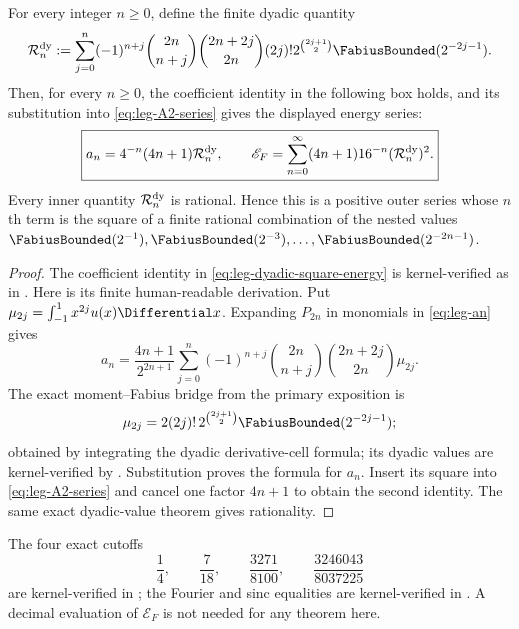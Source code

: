 \begin{corollary}
\label{cor:leg-dyadic-square-energy}
For every integer $n\ge0$, define the finite dyadic quantity
\begin{equation}
 \mathcal R_n^{\rm dy}:=
 \sum_{j=0}^{n}(-1)^{n+j}
 \binom{2n}{n+j}\binom{2n+2j}{2n}(2j)!
 2^{\binom{2j+1}{2}}\FabiusBounded(2^{-2j-1}).
 \label{eq:leg-dyadic-R}
\end{equation}
Then, for every $n\ge0$, the coefficient identity in the following box
holds, and its substitution into \eqref{eq:leg-A2-series} gives the displayed
energy series:
\begin{equation}
 \boxed{a_n=4^{-n}(4n+1)\mathcal R_n^{\rm dy},
 \qquad
 \mathscr E_F=\sum_{n=0}^{\infty}
 (4n+1)16^{-n}(\mathcal R_n^{\rm dy})^2.}
 \label{eq:leg-dyadic-square-energy}
\end{equation}
Every inner quantity $\mathcal R_n^{\rm dy}$ is rational.  Hence this is a
positive outer series whose $n$th term is the square of a finite rational
combination of the nested values
$\FabiusBounded(2^{-1}),\FabiusBounded(2^{-3}),\ldots,\FabiusBounded(2^{-2n-1})$.
\end{corollary}

\begin{proof}
The coefficient identity in \eqref{eq:leg-dyadic-square-energy} is
kernel-verified as
 in
.  Here is its finite human-readable
derivation.
Put $\mu_{2j}=\int_{-1}^{1}x^{2j}u(x)\Differential x$.  Expanding $P_{2n}$ in
monomials in \eqref{eq:leg-an} gives
\[
 a_n=\frac{4n+1}{2^{2n+1}}
 \sum_{j=0}^{n}(-1)^{n+j}
 \binom{2n}{n+j}\binom{2n+2j}{2n}\mu_{2j}.
\]
The exact moment--Fabius bridge from the primary exposition is
\[
 \mu_{2j}=2(2j)!\,2^{\binom{2j+1}{2}}\FabiusBounded(2^{-2j-1});
\]
obtained by integrating the dyadic derivative-cell formula; its dyadic
values are kernel-verified by .  Substitution proves
the formula for $a_n$.  Insert its square into
\eqref{eq:leg-A2-series} and cancel one factor $4n+1$ to obtain the second
identity.  The same exact dyadic-value theorem gives rationality.
\end{proof}

The four exact cutoffs
\[
 \frac14,\qquad\frac7{18},\qquad
 \frac{3271}{8100},\qquad
 \frac{3246043}{8037225}
\]
are kernel-verified in ; the Fourier
and sinc equalities are kernel-verified in
.  A decimal evaluation of
$\mathscr E_F$ is not
needed for any theorem here.

